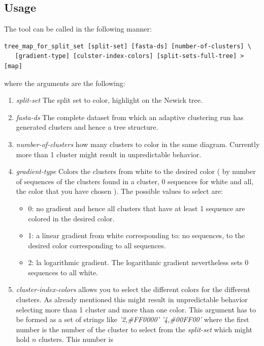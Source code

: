 \subsection{Usage}
The tool can be called in the following manner:
\begin{lstlisting}
tree_map_for_split_set [split-set] [fasta-ds] [number-of-clusters] \
   [gradient-type] [culster-index-colors] [split-sets-full-tree] > [map]
\end{lstlisting}
where the arguments are the following:
\begin{enumerate}
  \item \emph{split-set} The split set to color, highlight on the
    Newick tree.
  \item \emph{fasta-ds} The complete dataset from which an adaptive
    clustering run has generated clusters and hence a tree structure.
  \item \emph{number-of-clusters} how many clusters to color in the
    same diagram. Currently more than 1 cluster might result in
    unpredictable behavior.
  \item \emph{gradient-type}
    Colors the clusters from white to the desired color ( by number of
    sequences of the clusters found in a cluster, 0 sequences for white and all,
    the color that you have chosen ). The possible values to select
    are:
    \begin{itemize}
      \item 0: no gradient and hence all clusters that have at least 1
        sequence are colored in the desired color.
      \item 1: a linear gradient from white corresponding to: no
        sequences,
        to the desired color corresponding to all sequences.
      \item 2: la logarithmic gradient. The logarithmic gradient
        nevertheless sets 0 sequences to all white.
    \end{itemize}
  \item \emph{cluster-index-colors} allows you to select the different
    colors for the different clusters. As already mentioned this might
    result in unpredictable behavior selecting more than 1 cluster and
    more than one color. This argument has to be formed as a set of
    strings like \emph{'2,\#FF0000'} \emph{'4,\#00FF00'} where the
    first number is the number of the cluster to select from the
    \emph{split-set} which might hold $n$ clusters. This number is

\end{enumerate}
